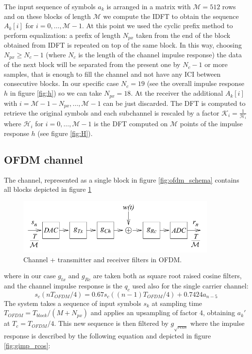 \documentclass[a4paper,11.5pt]{article}
\begin{document}
The input sequence of symbols $a_k$ is arranged in a matrix with $\mathcal{M}=512$ rows and on these blocks of length $\mathcal{M}$ we compute the IDFT to obtain the sequence $A_k[i]$ for $i=0,\dots , \mathcal{M}-1$. At this point we used the cyclic prefix method to perform equalization: a prefix of length $N_{px}$ taken from the end of the block obtained from IDFT is repeated on top of the same block. In this way, choosing $N_{px}\geq N_c-1$ (where $N_c$ is the length of the channel impulse response) the data of the next block will be separated from the present one by $N_c-1$ or more samples, that is enough to fill the channel and not have any ICI between consecutive blocks. In our specific case $N_c=19$ (see the overall impulse response $h$ in figure \ref{fig:h}) so we can take $N_{px}=18$.
 At the receiver the additional $A_k[i]$ with $i=\mathcal{M}-1-N_{px},\dots ,\mathcal{M}-1$ can be just discarded. The DFT is computed to retrieve the original symbols and each subchannel is rescaled by a factor $\mathcal{K}_i = \frac{1}{\mathcal{H}_i}$ where $\mathcal{H}_i$ for $i=0, \dots, \mathcal{M}-1$ is the DFT  computed on $\mathcal{M}$ points of the impulse response $h$ (see figure \ref{fig:H}).

\subsection*{OFDM channel}

The channel, represented as a single block in figure \ref{fig:ofdm_schema} contains all blocks depicted in figure \ref{fig:ofdm_channel_schema}

\begin{figure}[H]
	\begin{center}   
		\includegraphics[width=10cm]{figs/OFDM_channel_schema.png} 
		\caption{Channel + transmitter and receiver filters in OFDM.}
		\label{fig:ofdm_channel_schema}
	\end{center}
\end{figure}

where in our case $g_{tx}$ and $g_{Rc}$ are taken both as square root raised cosine filters, and the channel impulse response is the $q_c$ used also for the single carrier channel: 
\begin{equation}\label{eq:q_c}
s_c(nT_{OFDM}/4) = 0.67 s_c((n-1)T_{OFDM}/4) + 0.7424 a_{n-5}
\end{equation}
The system takes a sequence of input symbols $s_k$ at sampling time $T_{OFDM}=T_{block}/(M + N_{px})$ and applies an upsampling of factor 4, obtaining $a_k'$ at $T_c = T_{OFDM}/4$. This new sequence is then filtered by $g_{\sqrt{rcos}}$ where the impulse response is described by the following equation and depicted in figure \ref{fig:gimp_rcos}:
\end{document}
